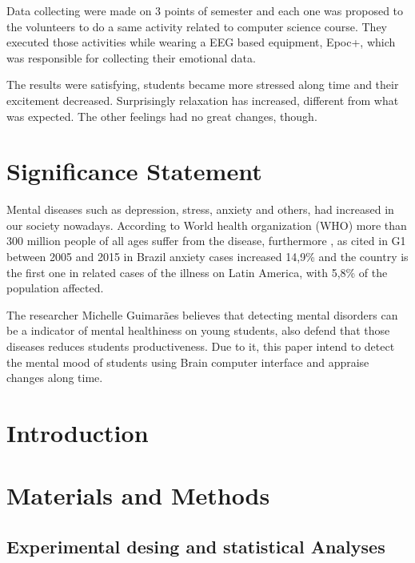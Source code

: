 \documentclass[12pt,openright,a4paper]{article}
\begin{document}
Data collecting were made on 3 points of semester and each one was proposed to the volunteers to do a same activity related to computer science course. They executed those activities  while wearing a EEG based equipment, Epoc+, which was responsible for collecting their emotional data.

The results were satisfying,  students became more stressed along time and their excitement decreased.     Surprisingly relaxation has increased, different from what was expected. The other feelings had no great changes, though.
\section{Significance Statement}
Mental diseases such as depression, stress, anxiety and others, had increased in our society nowadays.  According to World health organization (WHO)  more than 300 million people of all ages suffer from the disease, furthermore , as cited in G1 between 2005 and 2015 in Brazil anxiety cases increased 14,9\% and the country is the first one in related cases of the illness on Latin America, with 5,8\% of the population affected. 

The researcher Michelle Guimarães believes that detecting mental disorders can be a indicator of mental healthiness on young students, also defend that those diseases reduces students productiveness. Due to it, this paper intend to detect the mental mood of students using Brain computer interface and appraise changes along time.      
\section{Introduction}
\section{Materials and Methods}
\subsection{Experimental desing and statistical Analyses}
\end{document}
